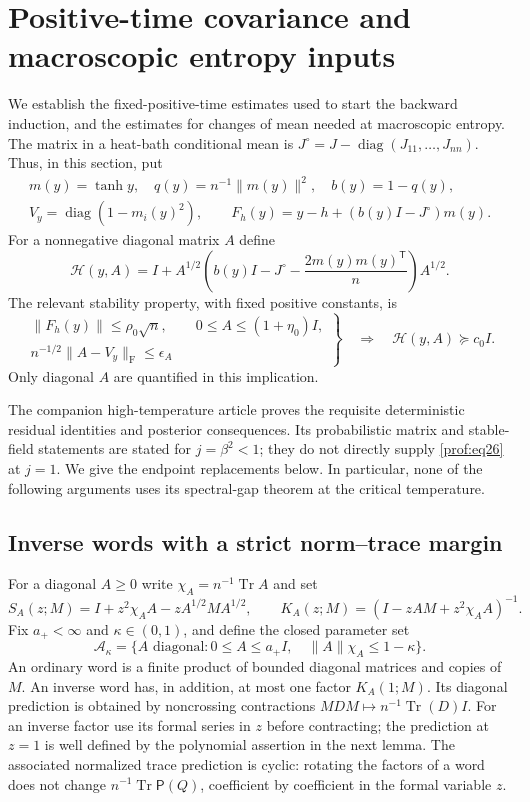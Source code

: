 \section{Positive-time covariance and macroscopic entropy inputs}
\label{prof:positive-inputs}

We establish the fixed-positive-time estimates used to start the backward
induction, and the estimates for changes of mean needed at macroscopic
entropy.  The matrix in a heat-bath conditional mean is
$J^\circ=J-\operatorname{diag}(J_{11},\ldots,J_{nn})$.  Thus, in this
section, put
\[
 \begin{gathered}
 m(y)=\tanh y,\quad q(y)=n^{-1}\|m(y)\|^2,\quad b(y)=1-q(y),\\
 V_y=\operatorname{diag}(1-m_i(y)^2),\qquad
 F_h(y)=y-h+(b(y)I-J^\circ)m(y).
 \end{gathered}
\]
For a nonnegative diagonal matrix $A$ define
\[
 \mathcal H(y,A)=I+A^{1/2}
 \left(b(y)I-J^\circ-\frac{2m(y)m(y)^{\mathsf T}}n\right)A^{1/2}.
\]
The relevant stability property, with fixed positive constants, is
\begin{equation}\label{prof:eq26}
 \left.
 \begin{gathered}
 \|F_h(y)\|\le\rho_0\sqrt n,\qquad
 0\le A\le(1+\eta_0)I,\\
 n^{-1/2}\|A-V_y\|_{\mathrm F}\le\epsilon_A
 \end{gathered}\right\}
 \quad\Longrightarrow\quad \mathcal H(y,A)\succeq c_0 I.
\end{equation}
Only diagonal $A$ are quantified in this implication.

The companion high-temperature article
\cite{AcceptedGap} proves the requisite deterministic residual
identities and posterior consequences.  Its probabilistic matrix and
stable-field statements are stated for $j=\beta^2<1$; they do not directly
supply \eqref{prof:eq26} at $j=1$.  We give the endpoint replacements below.
In particular, none of the following arguments uses its spectral-gap
theorem at the critical temperature.

\subsection{Inverse words with a strict norm--trace margin}

For a diagonal $A\ge0$ write $\chi_A=n^{-1}\operatorname{Tr}A$ and set
\[
 S_A(z;M)=I+z^2\chi_AA-zA^{1/2}MA^{1/2},\qquad
 K_A(z;M)=(I-zAM+z^2\chi_AA)^{-1}.
\]
Fix $a_+<\infty$ and $\kappa\in(0,1)$, and define the closed parameter set
\[
 \mathcal A_\kappa=
 \{A\text{ diagonal}:0\le A\le a_+I,\quad \|A\|\chi_A\le1-\kappa\}.
\]
An ordinary word is a finite product of bounded diagonal matrices and
copies of $M$.  An inverse word has, in addition, at most one factor
$K_A(1;M)$.  Its diagonal prediction is obtained by noncrossing
contractions $MDM\mapsto n^{-1}\operatorname{Tr}(D)I$.  For an inverse
factor use its formal series in $z$ before contracting; the prediction
at $z=1$ is well defined by the polynomial assertion in the next lemma.
The associated normalized trace prediction is cyclic: rotating the
factors of a word does not change
$n^{-1}\operatorname{Tr}\mathsf P(Q)$, coefficient by coefficient
in the formal variable $z$.

